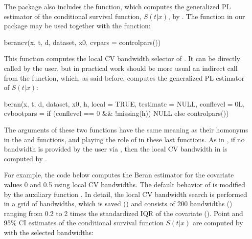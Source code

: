 The  package also includes the  function, which computes the generalized PL estimator of the conditional survival function, $S\left(t|x\right)$, by \cite{Beran}. The  function in our package may be used together with the  function:

\begin{example}
berancv(x, t, d, dataset, x0, cvpars = controlpars())
\end{example}

This function computes the local CV bandwidth selector of \cite{Geerdens}. It can be directly called by the user, but in practical work should be more usual an indirect call from the  function, which, as said before, computes the generalized PL estimator of $S\left(t|x \right)$: 

\begin{example}
beran(x, t, d, dataset, x0, h, local = TRUE, testimate = NULL, conflevel = 0L,
   cvbootpars = if (conflevel == 0 && !missing(h)) NULL else controlpars())
\end{example}

The arguments of these two functions have the same meaning as their homonyms in the  and  functions,  and  playing the role of  in these last functions. As in , if no bandwidth is provided by the user via , then the local CV bandwidth in \cite{Geerdens} is computed by .

For example, the code below computes the Beran estimator for the covariate values 0 and 0.5 using local CV bandwidths. The default behavior of  is modified by the auxiliary function . In detail, the local CV bandwidth search is performed in a grid of bandwidths, which is saved () and consists of 200 bandwidths () ranging from 0.2 to 2 times the standardized IQR of the covariate (). Point and 95\% CI estimates of the conditional survival function $S\left(t|x \right)$ are computed by  with the selected bandwidths:


